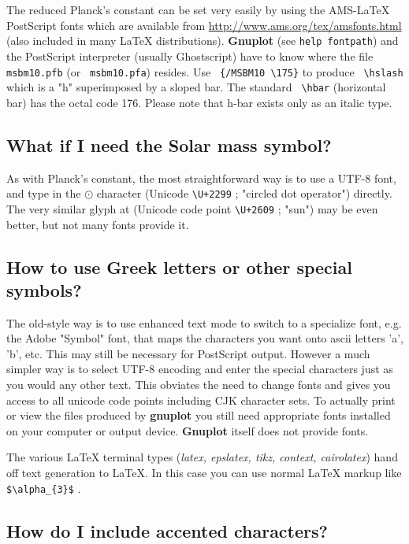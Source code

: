 \documentclass[letter,11pt]{article}
\def\http#1{{\small\href{http://#1}{\url{http://#1}}}}
\newcommand{\http}[1]%
            {\htmladdnormallink{\latex{\url{http://#1}}%
                    \html{\textit{http://#1}}}%
                {http://#1}%
            }
\newcommand{\gnuplot}{\textbf{gnuplot }}
\newcommand{\Gnuplot}{\textbf{Gnuplot }}
\begin{document}
{The reduced Planck's constant can be set very easily by using the
AMS-LaTeX PostScript fonts which are available from
\http{www.ams.org/tex/amsfonts.html} (also included in many LaTeX
distributions). \Gnuplot{} (see \verb+help fontpath+) and the
PostScript interpreter (usually Ghostscript) have to know where the
file \verb+ msbm10.pfb+ (or \verb+ msbm10.pfa+) resides. Use
\verb+ {/MSBM10 \175}+ to produce \verb+ \hslash+ which is a "h"
superimposed by a sloped bar. The standard \verb+ \hbar+ (horizontal
bar) has the octal code 176. Please note that h-bar exists only as an
italic type.

\subsection{What if I need the Solar mass symbol?}

As with Planck's constant, the most straightforward way is to use a
UTF-8 font, and type in the $\odot$ character
(Unicode {\verb&\U+2299&} ; "circled dot operator")
directly.  The very similar glyph at (Unicode code point {\verb&\U+2609&} ; "sun")
may be even better, but not many fonts provide it.

\subsection{How to use Greek letters or other special symbols?}

The old-style way is to use enhanced text mode to switch to a specialize font,
e.g. the Adobe "Symbol" font, that maps the characters you want onto ascii
letters 'a', 'b', etc.  This may still be necessary for PostScript output.
However a much simpler way is to select UTF-8 encoding and enter the
special characters just as you would any other text.
This obviates the need to change fonts and gives you access to all unicode
code points including CJK character sets.  To actually print or view the
files produced by \gnuplot you still need appropriate fonts installed on
your computer or output device.  \Gnuplot itself does not provide fonts.

The various \LaTeX{} terminal types (\textit{latex, epslatex, tikz, context, cairolatex})
hand off text generation to \LaTeX{}. In this case you can use normal \LaTeX{}
markup like \verb+$\alpha_{3}$+ .

\subsection{How do I include accented characters?}

}
\end{document}
